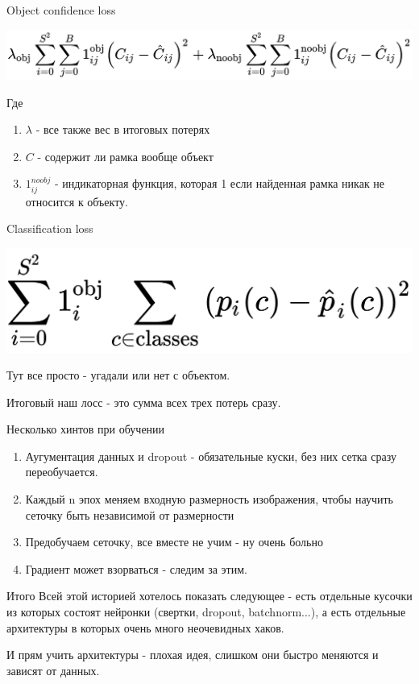 \documentclass[notes,12pt, aspectratio=169]{beamer}
\begin{document}
\begin{frame}{Object confidence loss}
\begin{center}
 \includegraphics[width=0.8\linewidth]{object_loss.png}
\end{center}

Где
 \begin{enumerate}
	\item $\lambda$ - все также вес в итоговых потерях
	\item $C$ - содержит ли рамка вообще объект 
	\item $1^{noobj}_{ij}$ - индикаторная функция, которая 1 если найденная рамка никак не относится к объекту.
	
\end{enumerate}
\end{frame}

\begin{frame}{Classification loss}
\begin{center}
 \includegraphics[width=0.6\linewidth]{class_loss.png}
\end{center}

Тут все просто - угадали или нет с объектом.
	
Итоговый наш лосс - это сумма всех трех потерь сразу.

\end{frame}

\begin{frame}{Несколько хинтов при обучении}
\begin{center}
 \begin{enumerate}
	\item Аугументация данных и dropout - обязательные куски, без них сетка сразу переобучается.
	\item Каждый n эпох меняем входную размерность изображения, чтобы научить сеточку быть независимой от размерности
	\item Предобучаем сеточку, все вместе не учим - ну очень больно
	\item Градиент может взорваться - следим за этим. 
	
\end{enumerate}
\end{center}

\end{frame}

\begin{frame}{Итого}
Всей этой историей хотелось показать следующее - есть отдельные кусочки из которых состоят нейронки (свертки, dropout, batchnorm...), а есть отдельные архитектуры в которых очень много неочевидных хаков.

И прям учить архитектуры - плохая идея, слишком они быстро меняются и зависят от данных.

\end{frame}
\end{document}
